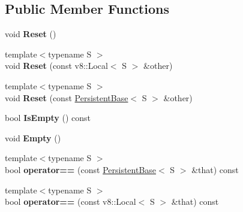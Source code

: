 \subsection*{Public Member Functions}
\begin{DoxyCompactItemize}
\item 
\mbox{\label{class_nan_1_1_persistent_base_ad608c1aa5de6529844dce2cc7e9d4566}} 
void {\bfseries Reset} ()
\item 
\mbox{\label{class_nan_1_1_persistent_base_aa7c5f71cfca5cd8d2a22c2824131b70c}} 
{\footnotesize template$<$typename S $>$ }\\void {\bfseries Reset} (const v8\+::\+Local$<$ S $>$ \&other)
\item 
\mbox{\label{class_nan_1_1_persistent_base_aea9945bf356be3085ba64a7e86f2ad4a}} 
{\footnotesize template$<$typename S $>$ }\\void {\bfseries Reset} (const \hyperlink{class_nan_1_1_persistent_base}{Persistent\+Base}$<$ S $>$ \&other)
\item 
\mbox{\label{class_nan_1_1_persistent_base_a26850e61539f33f39af6cf28a2bc9788}} 
bool {\bfseries Is\+Empty} () const
\item 
\mbox{\label{class_nan_1_1_persistent_base_a5d1e022b016a695d0a69a25be64d3284}} 
void {\bfseries Empty} ()
\item 
\mbox{\label{class_nan_1_1_persistent_base_abb641f705b96eb7b073e40a050a1c1f5}} 
{\footnotesize template$<$typename S $>$ }\\bool {\bfseries operator==} (const \hyperlink{class_nan_1_1_persistent_base}{Persistent\+Base}$<$ S $>$ \&that) const
\item 
\mbox{\label{class_nan_1_1_persistent_base_aa4b4d9c5e1d9b8967bf8072bf71efd9c}} 
{\footnotesize template$<$typename S $>$ }\\bool {\bfseries operator==} (const v8\+::\+Local$<$ S $>$ \&that) const
\item 
\mbox{\label{class_nan_1_1_persistent_base_a6a79e9fd697d235005a3c929edc1f884}} 

\end{DoxyCompactItemize}
